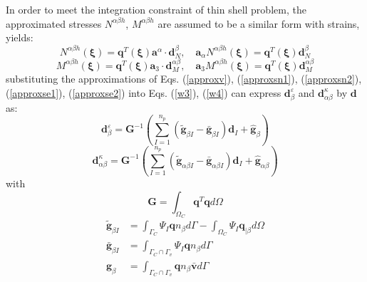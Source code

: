 In order to meet the integration constraint of thin shell problem, the approximated stresses $N^{\alpha\beta h}$, $M^{\alpha\beta h}$ are assumed to be a similar form with strains, yields:
\begin{equation}\label{approxse1}
N^{\alpha\beta h}(\boldsymbol \xi) = \boldsymbol q^T(\boldsymbol \xi) \boldsymbol a^\alpha \cdot \boldsymbol d^{\beta}_N,\quad
\boldsymbol a_\alpha N^{\alpha\beta h}(\boldsymbol \xi) = \boldsymbol q^T(\boldsymbol \xi) \boldsymbol d_N^\beta
\end{equation}
\begin{equation}\label{approxse2}
    M^{\alpha\beta h}(\boldsymbol \xi) = \boldsymbol q^T(\boldsymbol \xi) \boldsymbol a_3 \cdot \boldsymbol d^{\alpha\beta}_M,\quad
    \boldsymbol a_3 M^{\alpha\beta h}(\boldsymbol \xi) = \boldsymbol q^T(\boldsymbol \xi) \boldsymbol d^{\alpha\beta}_M
\end{equation}
substituting the approximations of Eqs. (\ref{approxv}), (\ref{approxsn1}), (\ref{approxsn2}), (\ref{approxse1}), (\ref{approxse2}) into Eqs. (\ref{w3}), (\ref{w4}) can express $\boldsymbol d^\varepsilon_\beta$ and $\boldsymbol d^\kappa_{\alpha\beta}$ by $\boldsymbol d$ as:
\begin{equation}\label{depsilon}
\boldsymbol d^\varepsilon_\beta = \boldsymbol G^{-1} \left (\sum_{I=1}^{n_p}(\tilde{\boldsymbol g}_{\beta I} - \bar{\boldsymbol g}_{\beta I}) \boldsymbol d_I + \hat{\boldsymbol g}_\beta \right )
\end{equation}
\begin{equation}\label{dkappa}
\boldsymbol d^\kappa_{\alpha\beta} = \boldsymbol G^{-1} \left (\sum_{I=1}^{n_p}(\tilde{\boldsymbol g}_{\alpha\beta I} - \bar{\boldsymbol g}_{\alpha\beta I})\boldsymbol d_I + \hat{\boldsymbol g}_{\alpha\beta} \right )
\end{equation}
with
\begin{equation}
\boldsymbol G = \int_{\Omega_C} \boldsymbol q^T \boldsymbol q d\Omega
\end{equation}
\begin{subequations}
\begin{align}
\tilde{\boldsymbol g}_{\beta I} &= \int_{\Gamma_C} \Psi_I \boldsymbol q n_\beta d\Gamma
- \int_{\Omega_C} \Psi_I \boldsymbol q_{\vert \beta} d\Omega \\
\bar{\boldsymbol g}_{\beta I} &= \int_{\Gamma_C\cap\Gamma_v} \Psi_I \boldsymbol q n_\beta d\Gamma \\
\hat{\boldsymbol g}_{\beta} &= \int_{\Gamma_C\cap\Gamma_v} \boldsymbol q n_\beta \bar{\boldsymbol v} d\Gamma 
\end{align}
\end{subequations}
